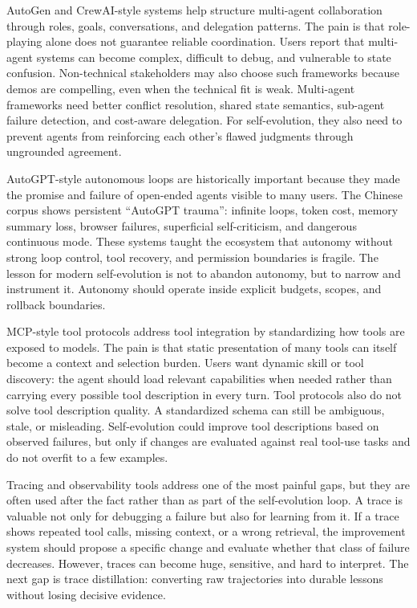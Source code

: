 AutoGen and CrewAI-style systems help structure multi-agent collaboration through roles, goals, conversations, and delegation patterns. The pain is that role-playing alone does not guarantee reliable coordination. Users report that multi-agent systems can become complex, difficult to debug, and vulnerable to state confusion. Non-technical stakeholders may also choose such frameworks because demos are compelling, even when the technical fit is weak. Multi-agent frameworks need better conflict resolution, shared state semantics, sub-agent failure detection, and cost-aware delegation. For self-evolution, they also need to prevent agents from reinforcing each other's flawed judgments through ungrounded agreement.

AutoGPT-style autonomous loops are historically important because they made the promise and failure of open-ended agents visible to many users. The Chinese corpus shows persistent ``AutoGPT trauma'': infinite loops, token cost, memory summary loss, browser failures, superficial self-criticism, and dangerous continuous mode. These systems taught the ecosystem that autonomy without strong loop control, tool recovery, and permission boundaries is fragile. The lesson for modern self-evolution is not to abandon autonomy, but to narrow and instrument it. Autonomy should operate inside explicit budgets, scopes, and rollback boundaries.

MCP-style tool protocols address tool integration by standardizing how tools are exposed to models. The pain is that static presentation of many tools can itself become a context and selection burden. Users want dynamic skill or tool discovery: the agent should load relevant capabilities when needed rather than carrying every possible tool description in every turn. Tool protocols also do not solve tool description quality. A standardized schema can still be ambiguous, stale, or misleading. Self-evolution could improve tool descriptions based on observed failures, but only if changes are evaluated against real tool-use tasks and do not overfit to a few examples.

Tracing and observability tools address one of the most painful gaps, but they are often used after the fact rather than as part of the self-evolution loop. A trace is valuable not only for debugging a failure but also for learning from it. If a trace shows repeated tool calls, missing context, or a wrong retrieval, the improvement system should propose a specific change and evaluate whether that class of failure decreases. However, traces can become huge, sensitive, and hard to interpret. The next gap is trace distillation: converting raw trajectories into durable lessons without losing decisive evidence.

